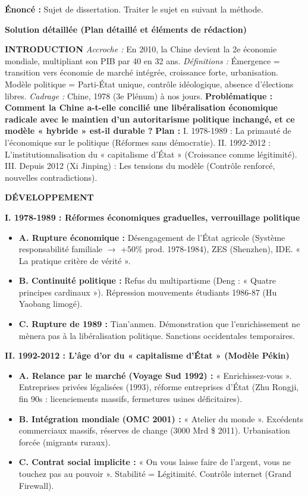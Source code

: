 \documentclass[11pt]{article}
\begin{document}
\begin{exoresolu}
\textbf{Énoncé :} Sujet de dissertation. Traiter le sujet en suivant la méthode.

\tcblower
\textbf{Solution détaillée (Plan détaillé et éléments de rédaction)}

\textbf{INTRODUCTION}
\textit{Accroche :} En 2010, la Chine devient la 2e économie mondiale, multipliant son PIB par 40 en 32 ans. 
\textit{Définitions :} Émergence = transition vers économie de marché intégrée, croissance forte, urbanisation. Modèle politique = Parti-État unique, contrôle idéologique, absence d'élections libres.
\textit{Cadrage :} Chine, 1978 (3e Plénum) à nos jours.
\textbf{Problématique :} \textbf{Comment la Chine a-t-elle concilié une libéralisation économique radicale avec le maintien d'un autoritarisme politique inchangé, et ce modèle « hybride » est-il durable ?}
\textbf{Plan :} 
I. 1978-1989 : La primauté de l'économique sur le politique (Réformes sans démocratie). 
II. 1992-2012 : L'institutionnalisation du « capitalisme d'État » (Croissance comme légitimité). 
III. Depuis 2012 (Xi Jinping) : Les tensions du modèle (Contrôle renforcé, nouvelles contradictions).

\textbf{DÉVELOPPEMENT}

\textbf{I. 1978-1989 : Réformes économiques graduelles, verrouillage politique}
\begin{itemize}
    \item \textbf{A. Rupture économique :} Désengagement de l'État agricole (Système responsabilité familiale $\rightarrow$ +50\% prod. 1978-1984), ZES (Shenzhen), IDE. « La pratique critère de vérité ».
    \item \textbf{B. Continuité politique :} Refus du multipartisme (Deng : « Quatre principes cardinaux »). Répression mouvements étudiants 1986-87 (Hu Yaobang limogé).
    \item \textbf{C. Rupture de 1989 :} Tian'anmen. Démonstration que l'enrichissement ne mènera pas à la libéralisation politique. Sanctions occidentales temporaires.
\end{itemize}

\textbf{II. 1992-2012 : L'âge d'or du « capitalisme d'État » (Modèle Pékin)}
\begin{itemize}
    \item \textbf{A. Relance par le marché (Voyage Sud 1992) :} « Enrichissez-vous ». Entreprises privées légalisées (1993), réforme entreprises d'État (Zhu Rongji, fin 90s : licenciements massifs, fermetures usines déficitaires).
    \item \textbf{B. Intégration mondiale (OMC 2001) :} « Atelier du monde ». Excédents commerciaux massifs, réserves de change (3000 Mrd \$ 2011). Urbanisation forcée (migrants ruraux).
    \item \textbf{C. Contrat social implicite :} « On vous laisse faire de l'argent, vous ne touchez pas au pouvoir ». Stabilité = Légitimité. Contrôle internet (Grand Firewall).
\end{itemize}


\end{exoresolu}
\end{document}
